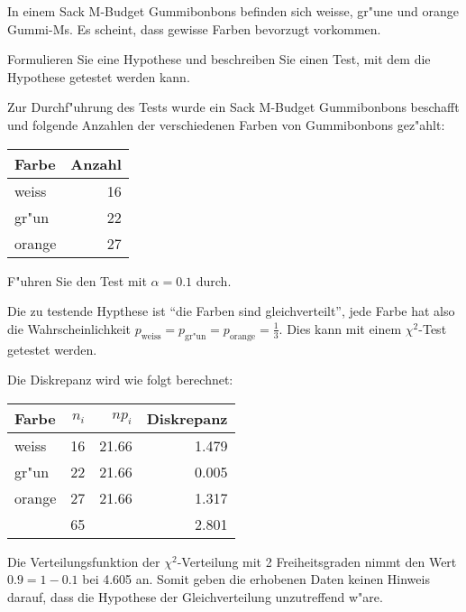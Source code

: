 In einem Sack M-Budget Gummibonbons befinden sich weisse, gr"une und orange
Gummi-Ms. Es scheint, dass gewisse Farben bevorzugt vorkommen.
\begin{teilaufgaben}
\item Formulieren Sie eine Hypothese und beschreiben Sie einen Test, mit
dem die Hypothese getestet werden kann.
\item Zur Durchf"uhrung des Tests wurde ein Sack M-Budget Gummibonbons
beschafft und folgende Anzahlen der verschiedenen Farben von Gummibonbons
gez"ahlt:
\begin{center}
\begin{tabular}{lr}
Farbe&Anzahl\\
\hline
weiss&16\\
gr"un&22\\
orange&27
\end{tabular}
\end{center}
F"uhren Sie den Test mit $\alpha = 0.1$ durch.
\end{teilaufgaben}

\begin{loesung}
\begin{teilaufgaben}
\item Die zu testende Hypthese ist ``die Farben sind gleichverteilt'', jede Farbe
hat also die Wahrscheinlichkeit
$p_{\text{weiss}}=p_{\text{gr"un}}=p_{\text{orange}}=\frac13$. Dies kann
mit einem $\chi^2$-Test getestet werden.
\item Die Diskrepanz wird wie folgt berechnet:
\begin{center}
\begin{tabular}{lrrr}
Farbe&$n_i$&$np_i$&Diskrepanz\\
\hline
weiss&16&21.66&1.479\\
gr"un&22&21.66&0.005\\
orange&27&21.66&1.317\\
\hline
&65&&2.801
\end{tabular}
\end{center}
Die Verteilungsfunktion der $\chi^2$-Verteilung mit 2 Freiheitsgraden nimmt
den Wert $0.9=1-0.1$ bei 4.605 an. Somit geben die erhobenen Daten keinen
Hinweis darauf, dass die Hypothese der Gleichverteilung unzutreffend w"are.
\end{teilaufgaben}
\end{loesung}

